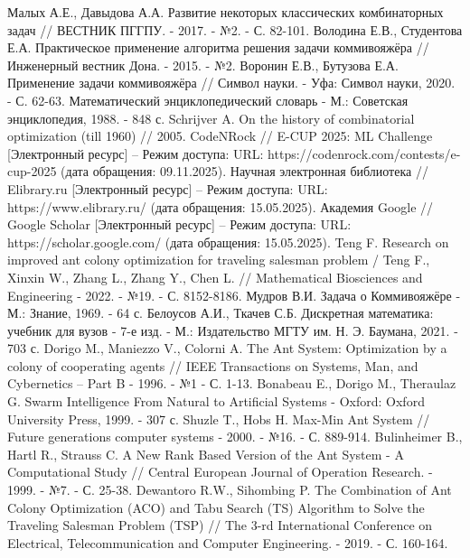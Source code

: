 \begin{thebibliography}{}
	 Малых А.Е., Давыдова А.А. Развитие некоторых классических комбинаторных задач // ВЕСТНИК ПГГПУ. - 2017. - №2. - С. 82-101.
	 Володина Е.В., Студентова Е.А. Практическое применение алгоритма решения задачи коммивояжёра // Инженерный вестник Дона. - 2015. - №2.
	 Воронин Е.В., Бутузова Е.А. Применение задачи коммивояжёра // Символ науки. - Уфа: Символ науки, 2020. - С. 62-63.
	 Математический энциклопедический словарь - М.: Советская энциклопедия, 1988. - 848 с.
	 Schrijver A. On the history of combinatorial optimization (till 1960) // 2005.
     CodeNRock // E-CUP 2025: ML Challenge [Электронный ресурс] -- Режим доступа: URL: https://codenrock.com/contests/e-cup-2025 (дата обращения: 09.11.2025).
     Научная электронная библиотека // Elibrary.ru [Электронный ресурс] -- Режим доступа: URL: https://www.elibrary.ru/ (дата обращения: 15.05.2025).
     Академия Google // Google Scholar [Электронный ресурс] -- Режим доступа: URL: https://scholar.google.com/ (дата обращения: 15.05.2025).
	 Teng F. Research on improved ant colony optimization for traveling salesman problem / Teng F., Xinxin W., Zhang L., Zhang Y., Chen L. // Mathematical Biosciences and Engineering - 2022. - №19. - С. 8152-8186.
	 Мудров В.И. Задача о Коммивояжёре - М.: Знание, 1969. - 64 с.
	 Белоусов А.И., Ткачев С.Б. Дискретная математика: учебник для вузов - 7-е изд. - М.: Издательство МГТУ им. Н. Э. Баумана, 2021. - 703 с.
	 Dorigo M., Maniezzo V., Colorni A. The Ant System: Optimization by a colony of cooperating agents // IEEE Transactions on Systems, Man, and Cybernetics -- Part B - 1996. - №1 - С. 1-13.
	 Bonabeau E., Dorigo M., Theraulaz G. Swarm Intelligence From Natural to Artificial Systems - Oxford: Oxford University Press, 1999. - 307 с.
	 Shuzle T., Hobs H. Max-Min Ant System // Future generations computer systems - 2000. - №16. - С. 889-914.
	 Bulinheimer B., Hartl R., Strauss C. A New Rank Based Version of the Ant System - A Computational Study // Central European Journal of Operation Research. - 1999. - №7. - С. 25-38.
	 Dewantoro R.W., Sihombing P. The Combination of Ant Colony Optimization (ACO) and Tabu Search (TS) Algorithm to Solve the Traveling Salesman Problem (TSP) // The 3-rd International Conference on Electrical, Telecommunication and Computer Engineering. - 2019. - С. 160-164.

\end{thebibliography}
